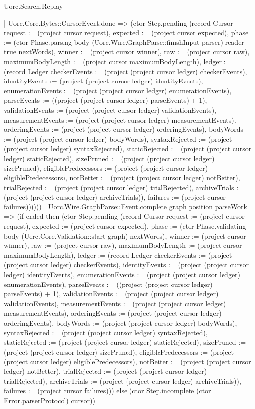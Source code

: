 \begin{lexlean}{Uorc.Search.Replay}
\begin{semanticmodule}
{          | Uorc.Core.Bytes::CursorEvent.done => (ctor Step.pending (record Cursor {request := (project cursor request), expected := (project cursor expected), phase := (ctor Phase.parsing body (Uorc.Wire.GraphParse::finishInput parser) reader true nextWords), winner := (project cursor winner), raw := (project cursor raw), maximumBodyLength := (project cursor maximumBodyLength), ledger := (record Ledger {checkerEvents := (project (project cursor ledger) checkerEvents), identityEvents := (project (project cursor ledger) identityEvents), enumerationEvents := (project (project cursor ledger) enumerationEvents), parseEvents := ((project (project cursor ledger) parseEvents) + 1), validationEvents := (project (project cursor ledger) validationEvents), measurementEvents := (project (project cursor ledger) measurementEvents), orderingEvents := (project (project cursor ledger) orderingEvents), bodyWords := (project (project cursor ledger) bodyWords), syntaxRejected := (project (project cursor ledger) syntaxRejected), staticRejected := (project (project cursor ledger) staticRejected), sizePruned := (project (project cursor ledger) sizePruned), eligiblePredecessors := (project (project cursor ledger) eligiblePredecessors), notBetter := (project (project cursor ledger) notBetter), trialRejected := (project (project cursor ledger) trialRejected), archiveTrials := (project (project cursor ledger) archiveTrials)}), failures := (project cursor failures)})))))
      | Uorc.Wire.GraphParse::Event.complete graph position parseWork => (if ended then (ctor Step.pending (record Cursor {request := (project cursor request), expected := (project cursor expected), phase := (ctor Phase.validating body (Uorc.Core.Validation::start graph) nextWords), winner := (project cursor winner), raw := (project cursor raw), maximumBodyLength := (project cursor maximumBodyLength), ledger := (record Ledger {checkerEvents := (project (project cursor ledger) checkerEvents), identityEvents := (project (project cursor ledger) identityEvents), enumerationEvents := (project (project cursor ledger) enumerationEvents), parseEvents := ((project (project cursor ledger) parseEvents) + 1), validationEvents := (project (project cursor ledger) validationEvents), measurementEvents := (project (project cursor ledger) measurementEvents), orderingEvents := (project (project cursor ledger) orderingEvents), bodyWords := (project (project cursor ledger) bodyWords), syntaxRejected := (project (project cursor ledger) syntaxRejected), staticRejected := (project (project cursor ledger) staticRejected), sizePruned := (project (project cursor ledger) sizePruned), eligiblePredecessors := (project (project cursor ledger) eligiblePredecessors), notBetter := (project (project cursor ledger) notBetter), trialRejected := (project (project cursor ledger) trialRejected), archiveTrials := (project (project cursor ledger) archiveTrials)}), failures := (project cursor failures)})) else (ctor Step.incomplete (ctor Error.parserProtocol) cursor))
}
\end{semanticmodule}
\end{lexlean}
